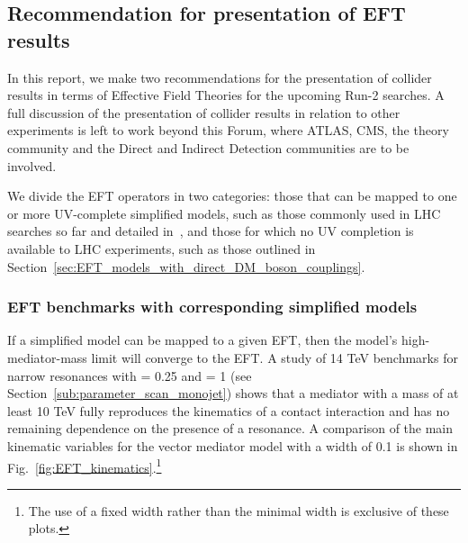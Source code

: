 \subsection{Recommendation for presentation of EFT results} %
\label{sec:RecommendationEFTResults}

In this report,
we make two recommendations for the presentation of collider results
in terms of Effective Field Theories for the upcoming Run-2 searches. 
A full discussion of the presentation of
collider results in relation to other experiments
is left to work beyond this Forum, where ATLAS, CMS, the theory community
and the Direct and Indirect Detection communities are to be involved. 

We divide the EFT operators in two categories: 
those that can be mapped to one or more UV-complete simplified models, such as those
commonly used in LHC searches so far and detailed in~\cite{Goodman:2010ku}, and those
for which no UV completion is available to LHC experiments, such as those outlined in Section~\ref{sec:EFT_models_with_direct_DM_boson_couplings}.

\subsubsection{EFT benchmarks with corresponding simplified models}
\label{sub:EFT_withSimp}

If a simplified model can be mapped to a given EFT, then the model's high-mediator-mass limit  will converge to the EFT.
A study of 14 TeV benchmarks for narrow resonances with \gq = 0.25 and \gDM = 1 (see Section~\ref{sub:parameter_scan_monojet})
shows that a mediator with a mass of at least 10 TeV fully reproduces the kinematics of a contact
interaction and has no remaining dependence on the presence of a resonance. 
A comparison of the main kinematic variables for the \schannel vector 
mediator model with a width of 0.1 \mMed
is shown in Fig.~\ref{fig:EFT_kinematics}.\footnote{The use of a fixed width rather than the minimal width is exclusive of these plots.} 

